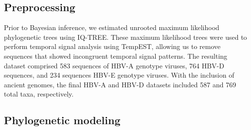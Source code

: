 \subsection{Preprocessing}

Prior to Bayesian inference, we estimated unrooted maximum likelihood phylogenetic trees using IQ-TREE\cite{iqtree}. %
These maximum likelihood trees were used to perform temporal signal analysis using TempEST\cite{tempest}, %
allowing us to remove sequences that showed incongruent temporal signal patterns.
The resulting dataset comprised 583 sequences of HBV-A genotype viruses, 764 HBV-D sequences, and 234 sequences HBV-E genotype viruses.
With the inclusion of ancient genomes, the final HBV-A and HBV-D datasets included 587 and 769 total taxa, respectively.

\subsection{Phylogenetic modeling}

